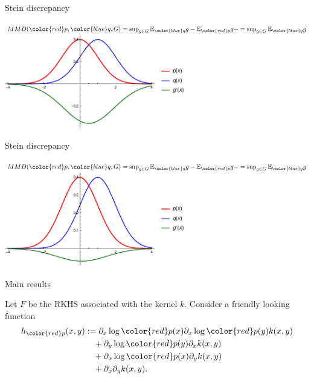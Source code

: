 \documentclass{beamer}
\begin{document}
  
 \begin{frame}{Stein discrepancy}
 \begin{center}
 
$MMD({\color{red} p},{ \color{blue} q},G) = \sup_{g\in G} \ev_{{ \color{blue} q}}g - \ev_{{\color{red} p}} g - = \sup_{g \in G} \ev_{{ \color{blue} q}} g $  \\
\vspace{0.5cm}
 \includegraphics[width=0.6\textwidth]{./img/s05.pdf} 
 \end{center}
 \end{frame} 
 
 
 \begin{frame}{Stein discrepancy}
 \begin{center}
 
$MMD({\color{red} p},{ \color{blue} q},G) = \sup_{g\in G} \ev_{{ \color{blue} q}}g - \ev_{{\color{red} p}} g - = \sup_{g \in G} \ev_{{ \color{blue} q}} g $  \\
\vspace{0.5cm}
 \includegraphics[width=0.6\textwidth]{./img/s01.pdf} 
 \end{center}
 \end{frame} 

 
\begin{frame}{Main results}
\begin{center}
 Let $F$ be the RKHS associated with the kernel $k$. Consider a friendly looking function
\begin{align*}
h_{{\color{red} p}}(x,y) & := \partial_{x} \log {\color{red} p}(x) \partial_{x} \log {\color{red} p}(y) k(x,y)\\
 & \quad+\partial_{y} \log {\color{red} p}(y) \partial_{x}  k(x,y)\\
 & \quad+\partial_{x} \log {\color{red} p}(x) \partial_{y}k(x,y)\\
 & \quad+\partial_{x} \partial_{y} k(x,y).
\end{align*}
\end{center}
\end{frame}
 
\end{document}
